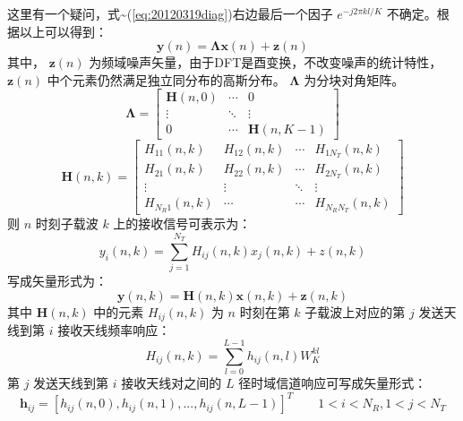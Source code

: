 \documentclass[10pt,a4paper,UTF8]{article}
\begin{document}
这里有一个疑问，式\textasciitilde{}(\ref{eq:20120319diag})右边最后一个因子 \(e^{-j2\pi kl/K}\) 不确定。根据以上可以得到：
\begin{equation}
  \label{eq:20120319yn2}
  \pmb{y}(n) = \pmb{\Lambda}\pmb{x}(n) + \pmb{z}(n)
\end{equation}
其中， \(\pmb{z}(n)\) 为频域噪声矢量，由于DFT是酉变换，不改变噪声的统计特性， \(\pmb{z}(n)\) 中个元素仍然满足独立同分布的高斯分布。  \(\pmb{\Lambda}\) 为分块对角矩阵。
\begin{equation}
  \label{eq:20120319lamda}
  \pmb{\Lambda} =
  \begin{bmatrix}
    \pmb{H}(n,0) & \cdots & 0 \\
    \vdots                &     \ddots & \vdots \\
    0                         & \cdots   & \pmb{H}(n,K-1)
  \end{bmatrix}
\end{equation}
\begin{equation}
  \label{eq:20120319hnk}
  \pmb{H}(n,k) =
  \begin{bmatrix}
    H_{11}(n,k)   &  H_{12}(n,k) & \cdots   & H_{1N_T}(n,k) \\
    H_{21}(n,k)   &  H_{22}(n,k) &  \cdots &  H_{2N_T}(n,k) \\
    \vdots          & \vdots          &\ddots &   \vdots  \\
    H_{N_R1}(n,k) & \cdots         &\cdots &  H_{N_RN_T}(n,k)
  \end{bmatrix}
\end{equation}
则 \(n\) 时刻子载波 \(k\) 上的接收信号可表示为：
\begin{equation}
  \label{eq:20120319yink}
 y_i(n,k) = \sum_{j=1}^{N_T} H_{ij}(n,k)x_j(n,k) + z(n,k)
\end{equation}
写成矢量形式为：
\begin{equation}
  \label{eq:20120319yinkvcetor}
  \pmb{y}(n,k) =\pmb{H}(n,k)\pmb{x}(n,k) + \pmb{z}(n,k)
\end{equation}
其中 \(\pmb{H}(n,k)\)  中的元素 \(H_{ij}(n,k)\) 为 \(n\) 时刻在第 \(k\) 子载波上对应的第 \(j\) 发送天线到第 \(i\) 接收天线频率响应：
\begin{equation}
  \label{eq:20120319hijnk}
  H_{ij}(n,k) = \sum_{l=0}^{L-1} h_{ij}(n,l) W_{K}^{kl}
\end{equation}
第 \(j\) 发送天线到第 \(i\) 接收天线对之间的 \(L\) 径时域信道响应可写成矢量形式：
\begin{equation}
  \mathbf{h}_{ij} = [h_{ij}(n,0), h_{ij}(n,1), ..., h_{ij}(n,L-1)]^T \qquad 1 < i < N_R, 1 < j < N_T
\end{equation}
\end{document}
